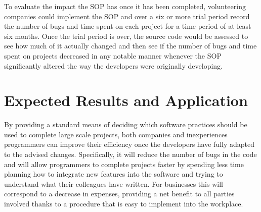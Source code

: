 \documentclass[12pt, letterpaper]{article}
\begin{document}
  To evaluate the impact the SOP has once it has been completed, volunteering companies could implement the SOP and over a six or more trial period record the number of bugs and time spent on each project for a time period of
  at least six months. Once the trial period is over, the source code would be assessed to see how much of it actually changed and then see if the number of bugs and time spent on projects decreased in any notable manner whenever
  the SOP significantly altered the way the developers were originally developing.
\section{Expected Results and Application}
  By providing a standard means of deciding which software practices should be used to complete large scale projects, both companies and inexperiences programmers can improve their efficiency once
  the developers have fully adapted to the advised changes. Specifically, it will reduce the number of bugs in the code and will allow programmers to complete projects faster by spending less time
  planning how to integrate new features into the software and trying to understand what their colleagues have written. For businesses this will correspond to a decrease in expenses, providing a net
  benefit to all parties involved thanks to a procedure that is easy to implement into the workplace.
\end{document}
